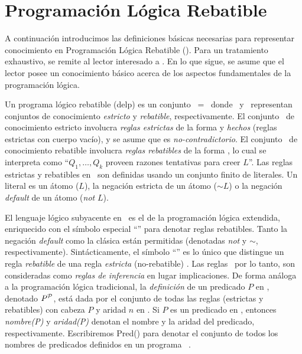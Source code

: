 \section{Programación Lógica Rebatible}

\label{sec:preliminaresDelp}


A continuación introducimos las definiciones básicas necesarias para representar conocimiento
en Programación Lógica Rebatible (\DLP). Para un tratamiento exhaustivo, se remite al lector
interesado a \cite{Garcia:2004a}. En lo que sigue, se asume que el lector posee un conocimiento básico acerca de los aspectos
fundamentales de la programación lógica. 

\begin{definicion}
	Un programa lógico rebatible (delp) es un conjunto \PP\ = \SD\ donde \SSet\ y \DD\ representan conjuntos
	de conocimiento \textit{estricto} y \textit{rebatible}, respectivamente. El conjunto \SSet\ de 
	conocimiento estricto involucra \textit{reglas estrictas} de la forma  y 					\textit{hechos} (reglas estrictas con cuerpo vacío), y se asume que es \textit{no-contradictorio}. 
	El conjunto \DD\ de conocimiento rebatible involucra \textit{reglas rebatibles} de la forma 
	, lo cual se interpreta como ``$Q_1,\ldots,Q_k$ proveen razones tentativas 
	para creer $L$''. Las reglas estrictas y rebatibles en \DLP\ son definidas usando un conjunto 
	finito de literales. Un literal es un átomo ($L$), la negación estricta de un átomo ($\sim L$) o 
	la negación \textit{default} de un átomo (\textit{not} $L$).
\end{definicion}

El lenguaje lógico subyacente en \DLP\ es el de la programación lógica extendida, %
enriquecido con el símbolo especial ``\drule{}{}'' para denotar reglas rebatibles. Tanto la negación 
\textit{default} como la clásica están permitidas (denotadas \textit{not} y \textit{$\sim$}, respectivamente).
Sintácticamente, el símbolo ``\drule{}{}'' es lo único que distingue un regla \textit{rebatible} 
 de una regla \textit{estricta} (no-rebatible) . 
Las reglas \DLP\, por lo tanto, son consideradas como \textit{reglas de inferencia} en lugar implicaciones.
De forma análoga a la programación lógica tradicional, la \textit{definición} de un predicado $P$ en \PP ,
denotado $P^{\scriptsize{\mbox{${\mathcal P}$}}}$, está dada por el conjunto de todas las reglas (estrictas y rebatibles) con cabeza $P$ 
y aridad $n$ en \PP . Si $P$ es un predicado en \PP , entonces \textit{nombre(P)} y \textit{aridad(P)} denotan
el nombre y la aridad del predicado, respectivamente. Escribiremos \textsf{Pred}(\PP) para denotar el conjunto
de todos los nombres de predicados definidos en un programa \DLP\ \PP.

